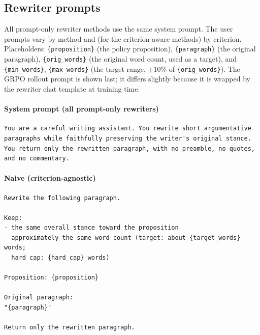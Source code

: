 \subsection{Rewriter prompts}\label{app:rewriter-prompts}

All prompt-only rewriter methods use the same system prompt. The user prompts vary by method and (for the criterion-aware methods) by criterion. Placeholders: \texttt{\{proposition\}} (the policy proposition), \texttt{\{paragraph\}} (the original paragraph), \texttt{\{orig\_words\}} (the original word count, used as a target), and \texttt{\{min\_words\}}, \texttt{\{max\_words\}} (the target range, $\pm 10\%$ of \texttt{\{orig\_words\}}). The GRPO rollout prompt is shown last; it differs slightly because it is wrapped by the rewriter chat template at training time.

\paragraph{System prompt (all prompt-only rewriters)}
\begin{Verbatim}[breaklines=true,breakanywhere=true,fontsize=\small,frame=single,framesep=2mm]
You are a careful writing assistant. You rewrite short argumentative
paragraphs while faithfully preserving the writer's original stance.
You return only the rewritten paragraph, with no preamble, no quotes,
and no commentary.
\end{Verbatim}

\paragraph{Naive (criterion-agnostic)}
\begin{Verbatim}[breaklines=true,breakanywhere=true,fontsize=\small,frame=single,framesep=2mm]
Rewrite the following paragraph.

Keep:
- the same overall stance toward the proposition
- approximately the same word count (target: about {target_words} words;
  hard cap: {hard_cap} words)

Proposition: {proposition}

Original paragraph:
"{paragraph}"

Return only the rewritten paragraph.
\end{Verbatim}


